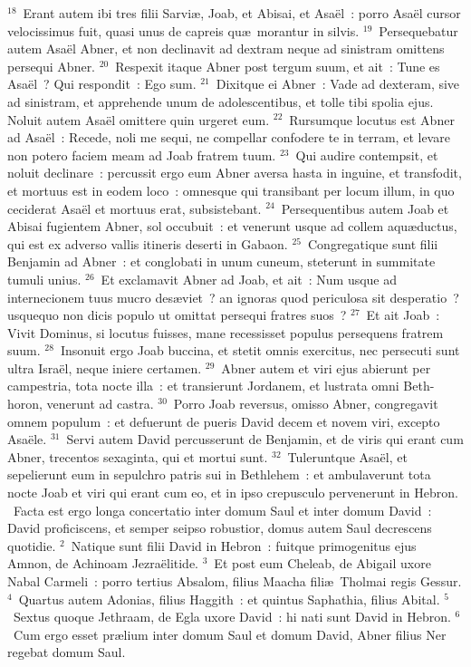 ${}^{18}$~Erant autem ibi tres filii Sarvi\ae , Joab, et Abisai, et Asa\"el~: porro Asa\"el cursor velocissimus fuit, quasi unus de capreis qu\ae\ morantur in silvis.
${}^{19}$~Persequebatur autem Asa\"el Abner, et non declinavit ad dextram neque ad sinistram omittens persequi Abner.
${}^{20}$~Respexit itaque Abner post tergum suum, et ait~: Tune es Asa\"el~? Qui respondit~: Ego sum.
${}^{21}$~Dixitque ei Abner~: Vade ad dexteram, sive ad sinistram, et apprehende unum de adolescentibus, et tolle tibi spolia ejus. Noluit autem Asa\"el omittere quin urgeret eum.
${}^{22}$~Rursumque locutus est Abner ad Asa\"el~: Recede, noli me sequi, ne compellar confodere te in terram, et levare non potero faciem meam ad Joab fratrem tuum.
${}^{23}$~Qui audire contempsit, et noluit declinare~: percussit ergo eum Abner aversa hasta in inguine, et transfodit, et mortuus est in eodem loco~: omnesque qui transibant per locum illum, in quo ceciderat Asa\"el et mortuus erat, subsistebant.
${}^{24}$~Persequentibus autem Joab et Abisai fugientem Abner, sol occubuit~: et venerunt usque ad collem aqu\ae ductus, qui est ex adverso vallis itineris deserti in Gabaon.
${}^{25}$~Congregatique sunt filii Benjamin ad Abner~: et conglobati in unum cuneum, steterunt in summitate tumuli unius.
${}^{26}$~Et exclamavit Abner ad Joab, et ait~: Num usque ad internecionem tuus mucro des\ae viet~? an ignoras quod periculosa sit desperatio~? usquequo non dicis populo ut omittat persequi fratres suos~?
${}^{27}$~Et ait Joab~: Vivit Dominus, si locutus fuisses, mane recessisset populus persequens fratrem suum.
${}^{28}$~Insonuit ergo Joab buccina, et stetit omnis exercitus, nec persecuti sunt ultra Isra\"el, neque iniere certamen.
${}^{29}$~Abner autem et viri ejus abierunt per campestria, tota nocte illa~: et transierunt Jordanem, et lustrata omni Beth-horon, venerunt ad castra.
${}^{30}$~Porro Joab reversus, omisso Abner, congregavit omnem populum~: et defuerunt de pueris David decem et novem viri, excepto Asa\"ele.
${}^{31}$~Servi autem David percusserunt de Benjamin, et de viris qui erant cum Abner, trecentos sexaginta, qui et mortui sunt.
${}^{32}$~Tuleruntque Asa\"el, et sepelierunt eum in sepulchro patris sui in Bethlehem~: et ambulaverunt tota nocte Joab et viri qui erant cum eo, et in ipso crepusculo pervenerunt in Hebron.
~Facta est ergo longa concertatio inter domum Saul et inter domum David~: David proficiscens, et semper seipso robustior, domus autem Saul decrescens quotidie.
${}^{2}$~Natique sunt filii David in Hebron~: fuitque primogenitus ejus Amnon, de Achinoam Jezra\"elitide.
${}^{3}$~Et post eum Cheleab, de Abigail uxore Nabal Carmeli~: porro tertius Absalom, filius Maacha fili\ae\ Tholmai regis Gessur.
${}^{4}$~Quartus autem Adonias, filius Haggith~: et quintus Saphathia, filius Abital.
${}^{5}$~Sextus quoque Jethraam, de Egla uxore David~: hi nati sunt David in Hebron.
${}^{6}$~Cum ergo esset pr\ae lium inter domum Saul et domum David, Abner filius Ner regebat domum Saul.


